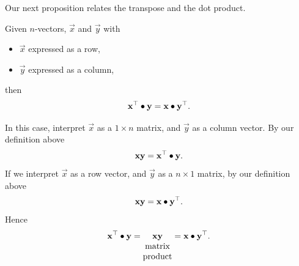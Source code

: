 \documentclass{ximera}
\begin{document}
Our next proposition relates the transpose and the dot product.


\begin{proposition}
  Given $n$-vectors, $\vec{x}$ and $\vec y$ with
  \begin{itemize}
  \item $\vec{x}$ expressed as a row,
  \item $\vec{y}$ expressed as a column,
  \end{itemize}
  then
  \[
    \mathbf{x}^\top\bullet \mathbf{y} = \mathbf{x}\bullet\mathbf{y}^\top.
  \]

  \begin{explanation}
    In this case, interpret $\vec{x}$ as a $1\times n$ matrix, and
    $\vec{y}$ as a column vector. By our definition above
    \[
      \mathbf{x}\mathbf{y} = \mathbf{x}^\top\bullet \mathbf{y}.
    \]
    If we interpret $\vec{x}$ as a row vector, and
    $\vec{y}$ as a $n\times 1$ matrix, by our definition above
    \[
      \mathbf{x}\mathbf{y} = \mathbf{x}\bullet\mathbf{y}^\top.
    \]
    Hence
    \[
      \mathbf{x}^\top\bullet \mathbf{y} = \underset{\begin{matrix}\text{matrix}\\\text{product}\end{matrix}}{\mathbf{x}\mathbf{y}} = \mathbf{x}\bullet\mathbf{y}^\top.
    \]
  \end{explanation}
\end{proposition}
\end{document}
